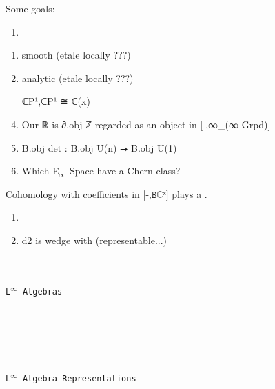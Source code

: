 \documentclass{book}
\theoremstyle{definition}
\renewcommand{\chapter}[1]{
\newpage
{
\Huge 
\begin{center}
\ \\
\ \\
\thispagestyle{empty}
\texttt{#1}
\end{center}}
\ \\
\ \\
}
\begin{document}

    Some goals:
    \begin{enumerate}
    \item 
    \end{enumerate}

    \begin{enumerate}
    \item smooth (etale locally ???)
    \item analytic (etale locally ???)
    \item [ℂP¹,ℂP¹] ≅ ℂ(x)
    \item Our ℝ is ∂.obj ℤ regarded as an object in [γ⃗,∞\_(∞-Grpd)]
    \item B.obj det : B.obj U(n) ⭢ B.obj U(1)
    \item Which E${}_{\infty}$ Space have a Chern class?
    \end{enumerate}

    Cohomology with coefficients in $\texttt{[-,Bℂˣ]}$ plays a .\\

\begin{enumerate}
\item 
\item d2 is wedge with (representable...)
\end{enumerate}



\chapter{L${}^{\infty}$ Algebras}




\chapter{L${}^{\infty}$ Algebra Representations}
\end{document}
